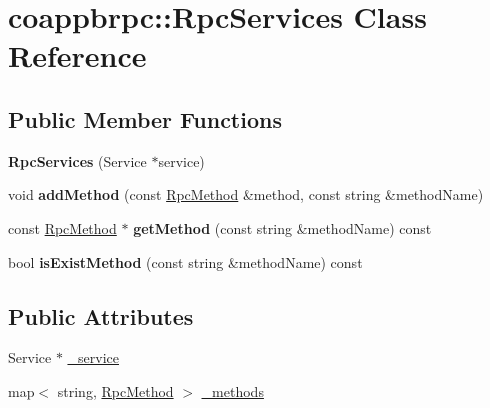 \hypertarget{classcoappbrpc_1_1RpcServices}{}\section{coappbrpc\+:\+:Rpc\+Services Class Reference}
\label{classcoappbrpc_1_1RpcServices}
\subsection*{Public Member Functions}
\begin{DoxyCompactItemize}
\item 
\mbox{\label{classcoappbrpc_1_1RpcServices_aa3cdc040a1e72678886d907ec59a45f8}} 
{\bfseries Rpc\+Services} (Service $\ast$service)
\item 
\mbox{\label{classcoappbrpc_1_1RpcServices_a8006adde11ab529e9ff7a1d8b2409271}} 
void {\bfseries add\+Method} (const \hyperlink{classcoappbrpc_1_1RpcMethod}{Rpc\+Method} \&method, const string \&method\+Name)
\item 
\mbox{\label{classcoappbrpc_1_1RpcServices_a121fcbaaf676412144d722f87fac41ec}} 
const \hyperlink{classcoappbrpc_1_1RpcMethod}{Rpc\+Method} $\ast$ {\bfseries get\+Method} (const string \&method\+Name) const
\item 
\mbox{\label{classcoappbrpc_1_1RpcServices_a2f031b2144a1443b7e72bbd6dfb5d2d4}} 
bool {\bfseries is\+Exist\+Method} (const string \&method\+Name) const
\end{DoxyCompactItemize}
\subsection*{Public Attributes}
\begin{DoxyCompactItemize}
\item 
Service $\ast$ \hyperlink{classcoappbrpc_1_1RpcServices_a0acd95e0c580d1478a9034de3b854d5c}{\+\_\+service}
\item 
map$<$ string, \hyperlink{classcoappbrpc_1_1RpcMethod}{Rpc\+Method} $>$ \hyperlink{classcoappbrpc_1_1RpcServices_a429ceb54bd91716fd358c9045e262506}{\+\_\+methods}
\end{DoxyCompactItemize}



